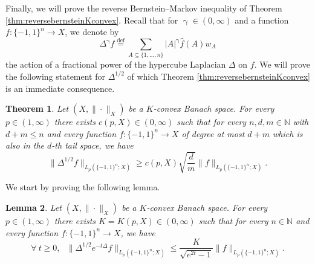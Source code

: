 \documentclass[11pt,reqno]{amsart}
\renewcommand{\leq}{\leqslant}
\renewcommand{\geq}{\geqslant}
\renewcommand{\gamma}{\upgamma}
\newcommand{\1}{\mathbf 1}
\newtheorem{theorem}{Theorem}
\newtheorem{lemma}[theorem]{Lemma}
\theoremstyle{remark}
\newcommand{\N}{\mathbb N}
\newcommand{\eqdef}{\stackrel{\mathrm{def}}{=}}
\renewcommand{\gamma}{\upgamma}
\begin{document}
\medskip

Finally, we will prove the reverse Bernstein--Markov inequality of Theorem \ref{thm:reversebernsteinKconvex}. Recall that for $\gamma\in(0,\infty)$ and a function $f:\{-1,1\}^n\to X$, we denote by
\begin{equation}
\Delta^\gamma f \eqdef \sum_{A\subseteq\{1,\ldots,n\}} |A|^\gamma \widehat{f}(A) w_A
\end{equation}
the action of a fractional power of the hypercube Laplacian $\Delta$ on $f$. We will prove the following statement for $\Delta^{1/2}$ of which Theorem \ref{thm:reversebernsteinKconvex} is an immediate consequence.

\begin{theorem} \label{thm:delta1/2}
Let $(X,\|\cdot\|_X)$ be a $K$-convex Banach space. For every $p\in(1,\infty)$ there exists $c(p,X)\in(0,\infty)$ such that for every $n,d,m\in\N$ with $d+m\leq n$ and every function $f:\{-1,1\}^n\to X$ of degree at most $d+m$ which is also in the $d$-th tail space, we have
\begin{equation} \label{eq:delta1/2}
\|\Delta^{1/2} f\|_{L_p(\{-1,1\}^n;X)} \geq c(p,X) \sqrt{\frac{d}{m}} \|f\|_{L_p(\{-1,1\}^n;X)}.
\end{equation}
\end{theorem}

We start by proving the following lemma.

\begin{lemma} \label{lem:cauchyformula}
Let $(X,\|\cdot\|_X)$ be a $K$-convex Banach space. For every $p\in(1,\infty)$ there exists $K=K(p,X)\in(0,\infty)$ such that for every $n\in\N$ and every function $f:\{-1,1\}^n\to X$, we have
\begin{equation} \label{eq:cauchyformula}
\forall \ t\geq0, \ \ \  \|\Delta^{1/2} e^{-t\Delta}f\|_{L_p(\{-1,1\}^n;X)} \leq \frac{K}{\sqrt{e^{2t}-1}} \|f\|_{L_p(\{-1,1\}^n;X)}.
\end{equation}
\end{lemma}
\end{document}
